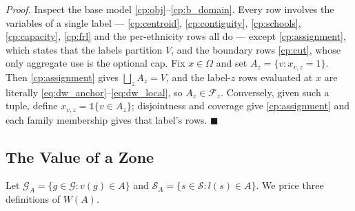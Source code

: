 \documentclass{article}
\begin{document}
\textit{Proof.} Inspect the base model
\eqref{cp:obj}--\eqref{cp:b_domain}. Every row involves the variables of a
single label --- \eqref{cp:centroid}, \eqref{cp:contiguity},
\eqref{cp:schools}, \eqref{cp:capacity}, \eqref{cp:frl} and the per-ethnicity
rows all do --- except \eqref{cp:assignment}, which states that the labels
partition $V$, and the boundary rows \eqref{cp:cut}, whose only aggregate use
is the optional cap. Fix $x \in \Omega$ and set
$A_z = \{v : x_{v,z} = 1\}$. Then \eqref{cp:assignment} gives
$\bigsqcup_z A_z = V$, and the label-$z$ rows evaluated at $x$ are literally
\eqref{eq:dw_anchor}--\eqref{eq:dw_local}, so $A_z \in \mathcal F_z$.
Conversely, given such a tuple, define $x_{v,z} = \mathds{1}\{v \in A_z\}$;
disjointness and coverage give \eqref{cp:assignment} and each family membership
gives that label's rows. $\blacksquare$

\subsection{The Value of a Zone}
\label{app:dw_value}

Let $\mathcal G_A = \{g \in \mathcal G : v(g) \in A\}$ and
$\mathcal S_A = \{s \in \mathcal S : l(s) \in A\}$. We price three definitions
of $W(A)$.
\end{document}
